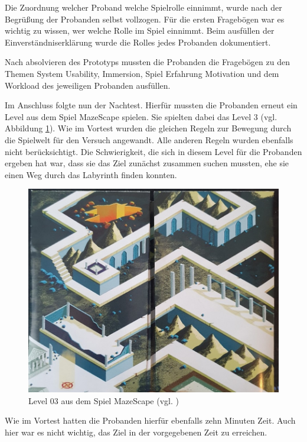 Die Zuordnung welcher Proband welche Spielrolle einnimmt, wurde nach der Begrüßung der Probanden selbst vollzogen. Für die ersten Fragebögen war es wichtig zu wissen, wer welche Rolle im Spiel einnimmt. Beim ausfüllen der Einverständniserklärung wurde die Rolles jedes Probanden dokumentiert.

Nach absolvieren des Prototyps mussten die Probanden die Fragebögen zu den Themen System Usability, Immersion, Spiel Erfahrung Motivation und dem Workload des jeweiligen Probanden ausfüllen.

Im Anschluss folgte nun der Nachtest. Hierfür mussten die Probanden erneut ein Level aus dem Spiel MazeScape spielen. Sie spielten dabei das Level 3 (vgl. Abbildung \ref{fig:mazescape_level-03}). Wie im Vortest wurden die gleichen Regeln zur Bewegung durch die Spielwelt für den Versuch angewandt. Alle anderen Regeln wurden ebenfalls nicht berücksichtigt. Die Schwierigkeit, die sich in diesem Level für die Probanden ergeben hat  war, dass sie das Ziel zunächst zusammen suchen mussten, ehe sie einen Weg durch das Labyrinth finden konnten.

\begin{figure}[ht]
\centering
\includegraphics[width=1\linewidth]{content/pictures/MazeScape_Level03.jpg}
\caption{Level 03 aus dem Spiel MazeScape (vgl. \cite{noauthor_mazescape_nodate})}
\label{fig:mazescape_level-03}
\end{figure}

Wie im Vortest hatten die Probanden hierfür ebenfalls zehn Minuten Zeit. Auch hier war es nicht wichtig, das Ziel in der vorgegebenen Zeit zu erreichen. 

